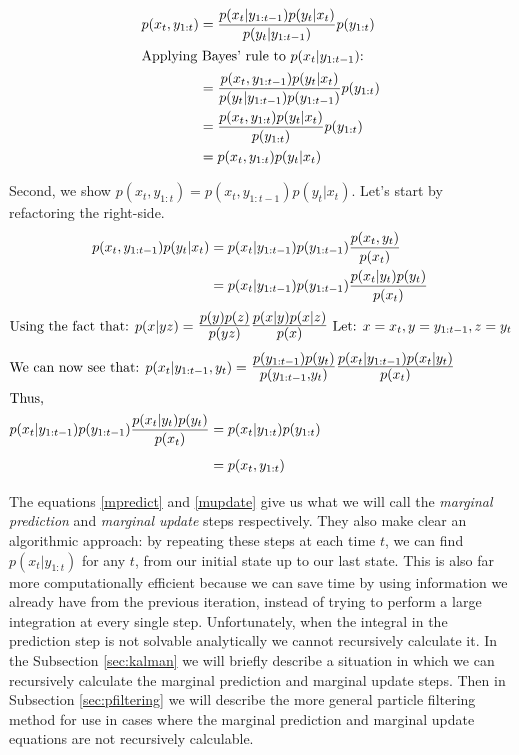 \documentclass{article}
\begin{document}
\begin{align*}
p(x_t,y_{1:t}) &= \frac{p(x_t|y_{1:t-1})p(y_t|x_t)}{p(y_t|y_{1:t-1})}p(y_{1:t}) \\
\intertext{Applying Bayes' rule to $p(x_t|y_{1:t-1})$:}
&= \frac{p(x_t,y_{1:t-1})p(y_t|x_t)}{p(y_t|y_{1:t-1})p(y_{1:t-1})}p(y_{1:t}) \\
&= \frac{p(x_t,y_{1:t})p(y_t|x_t)}{p(y_{1:t})}p(y_{1:t}) \\
&= p(x_t,y_{1:t})p(y_t|x_t)
\end{align*}

\noindent
Second, we show $p(x_t,y_{1:t}) = p(x_t,y_{1:t-1})p(y_t|x_t)$. Let's start by refactoring the right-side.
\begin{align*}
p(x_t,y_{1:t-1})p(y_t|x_t)
&= p(x_t|y_{1:t-1})p(y_{1:t-1})\frac{p(x_t,y_t)}{p(x_t)}\\
&= p(x_t|y_{1:t-1})p(y_{1:t-1})\frac{p(x_t|y_t)p(y_t)}{p(x_t)}\\
\intertext{Using the fact that: $p(x|yz) =$ {\Large $\frac{p(y)p(z)}{p(yz)}\frac{p(x|y)p(x|z)}{p(x)}$}
  Let: $x=x_t, y=y_{1:t-1}, z = y_t$}
\intertext{We can now see that:  $p(x_t|y_{1:t-1},y_t) =$ {\Large $\frac{p(y_{1:t-1})p(y_t)}{p(y_{1:t-1},y_t)}\frac{p(x_t|y_{1:t-1})p(x_t|y_t)}{p(x_t)}$}}
\intertext{Thus,}
p(x_t|y_{1:t-1})p(y_{1:t-1})\frac{p(x_t|y_t)p(y_t)}{p(x_t)}
&= p(x_t|y_{1:t})p(y_{1:t})\\
&= p(x_t,y_{1:t})\\
\end{align*}

The equations \eqref{mpredict} and \eqref{mupdate} give us what we will call the \textit{marginal prediction} and \textit{marginal update} steps respectively. They also make clear an algorithmic approach: by repeating these steps at each time $t$, we can find
$p(x_t|y_{1:t})$ for any $t$, from our initial state up to our last state. This is also far more computationally efficient because we can save time by using information we already have from the previous iteration, instead of trying to perform a large integration at every single step. Unfortunately, when the integral in the prediction step is not solvable analytically we cannot recursively calculate it. In the Subsection \ref{sec:kalman} we will briefly describe a situation in which we can recursively calculate the marginal prediction and marginal update steps. Then in Subsection \ref{sec:pfiltering} we will describe the more general particle filtering method for use in cases where the marginal prediction and marginal update equations are not recursively calculable.
\end{document}
